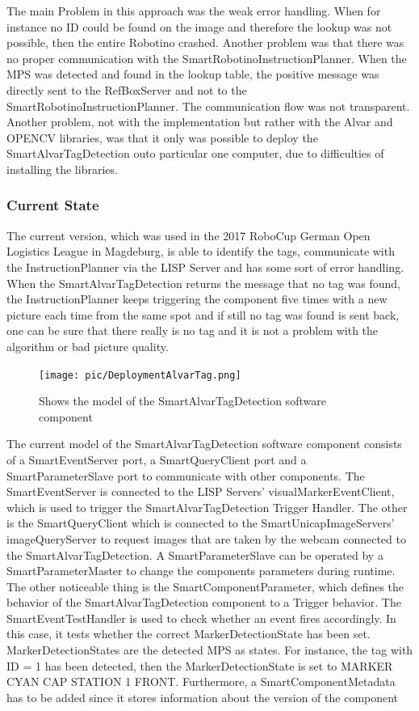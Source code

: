 The main Problem in this approach was the weak error handling. When for instance no ID could be found on the image and therefore the lookup was not possible, then the entire Robotino crashed. Another problem was that there was no proper communication with the SmartRobotinoInstructionPlanner. When the MPS was detected and found in the lookup table, the positive message was directly sent to the RefBoxServer and not to the SmartRobotinoInstructionPlanner. The communication flow was not transparent. Another problem, not with the implementation but rather with the Alvar and OPENCV libraries, was that it only was possible to deploy the SmartAlvarTagDetection outo particular one computer, due to difficulties of installing the libraries.



\subsubsection{Current State}

The current version, which was used in the 2017 RoboCup German Open Logistics League in Magdeburg, is able to identify the tags, communicate with the InstructionPlanner via the LISP Server and has some sort of error handling. When the SmartAlvarTagDetection returns the message that no tag was found, the InstructionPlanner keeps triggering the component five times with a new picture each time from the same spot and if still no tag was found is sent back, one can be sure that there really is no tag and it is not a problem with the algorithm or bad picture quality. \\

\begin{figure}[h]
\centering
\texttt{[image: pic/DeploymentAlvarTag.png]}
\caption{Shows the model of the SmartAlvarTagDetection software component}
\label{fig:smartAlvarFlow}
\end{figure}



The current model of the SmartAlvarTagDetection software component consists of a SmartEventServer port, a SmartQueryClient port and a SmartParameterSlave port to communicate with other components. The SmartEventServer is connected to the LISP Servers' visualMarkerEventClient, which is used to trigger the SmartAlvarTagDetection Trigger Handler. The other is the SmartQueryClient which is connected to the SmartUnicapImageServers' imageQueryServer to request images that are taken by the webcam connected to the SmartAlvarTagDetection. A SmartParameterSlave can be operated by a SmartParameterMaster to change the components parameters during runtime. The other noticeable thing is the SmartComponentParameter, which defines the behavior of the SmartAlvarTagDetection component to a Trigger behavior. The SmartEventTestHandler is used to check whether an event fires accordingly. In this case, it tests whether the correct MarkerDetectionState has been set. MarkerDetectionStates are the detected MPS as states. For instance, the tag with ID = 1 has been detected, then the MarkerDetectionState is set to MARKER CYAN CAP STATION 1 FRONT. Furthermore, a SmartComponentMetadata has to be added since it stores information about the version of the component\\

